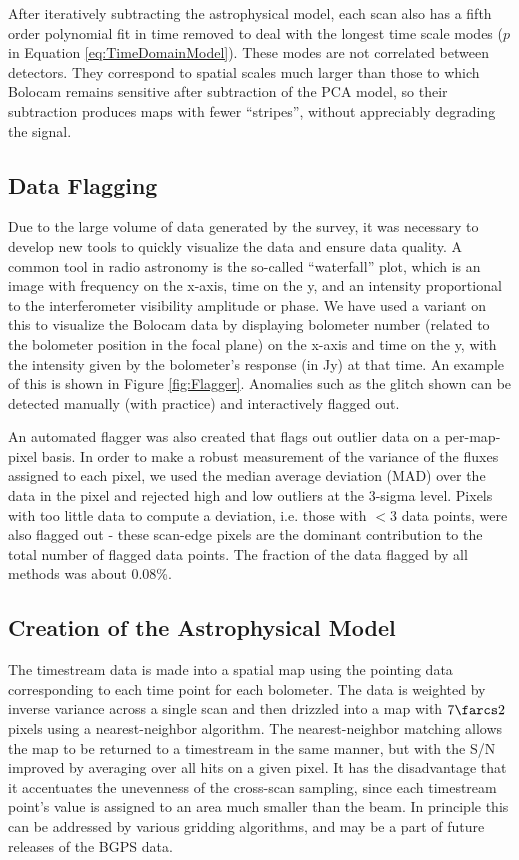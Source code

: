 \documentclass[12pt,preprint]{aastex}
\begin{document}
After iteratively subtracting the astrophysical model, each scan also
has a fifth order polynomial fit in time removed to deal with the
longest time scale modes ($p$ in Equation \ref{eq:TimeDomainModel}).
These modes are not correlated between detectors.  They correspond to
spatial scales much larger than those to which Bolocam remains
sensitive after subtraction of the PCA model, so their subtraction
produces maps with fewer ``stripes'', without appreciably degrading
the signal.

\subsection{Data Flagging}

Due to the large volume of data generated by the survey, it was
necessary to develop new tools to quickly visualize the data and
ensure data quality.  A common tool in radio astronomy is the
so-called ``waterfall'' plot, which is an image with frequency on the
x-axis, time on the y, and an intensity proportional to the
interferometer visibility amplitude or phase.  We have used a variant
on this to visualize the Bolocam data by displaying bolometer number
(related to the bolometer position in the focal plane) on the x-axis
and time on the y, with the intensity given by the bolometer's
response (in Jy) at that time.  An example of this is shown in Figure
\ref{fig:Flagger}.  Anomalies such as the glitch shown can be detected
manually (with practice) and interactively flagged out.

An automated flagger was also created that flags out outlier data on a
per-map-pixel basis.  In order to make a robust measurement of the
variance of the fluxes assigned to each pixel, we used the median
average deviation (MAD) over the data in the pixel and rejected high
and low outliers at the 3-sigma level.  Pixels with too little data to
compute a deviation, i.e. those with $<3$ data points, were also
flagged out - these scan-edge pixels are the dominant contribution to
the total number of flagged data points.  The fraction of the data
flagged by all methods was about 0.08\%.

\subsection{Creation of the Astrophysical Model}

The timestream data is made into a spatial map using the pointing data
corresponding to each time point for each bolometer.  The data is
weighted by inverse variance across a single scan and then drizzled
into a map with $7\farcs2$ pixels using a nearest-neighbor algorithm.
The nearest-neighbor matching allows the map to be returned to a
timestream in the same manner, but with the S/N improved by averaging
over all hits on a given pixel.  It has the disadvantage that it
accentuates the unevenness of the cross-scan sampling, since each
timestream point's value is assigned to an area much smaller than the
beam.  In principle this can be addressed by various gridding
algorithms, and may be a part of future releases of the BGPS data.
\end{document}
